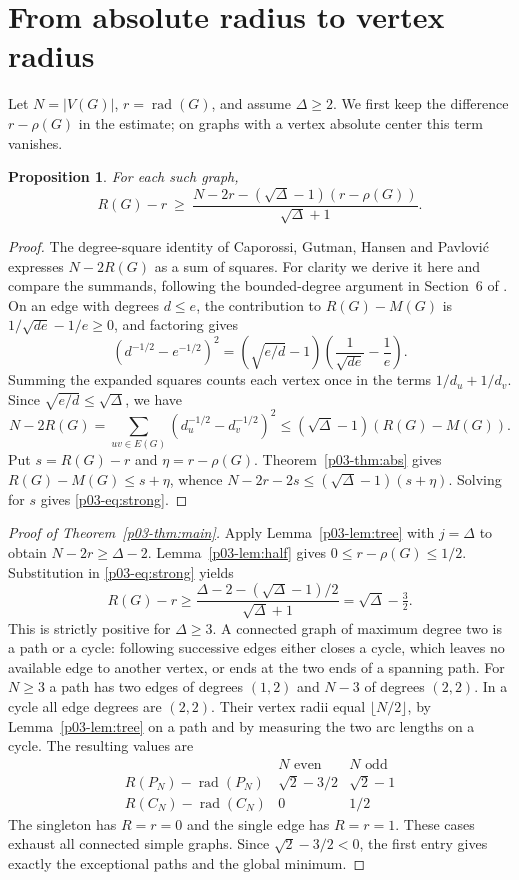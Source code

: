 \documentclass[11pt,a4paper]{article}
\newtheorem{proposition}[theorem]{Proposition}
\newcommand{\rad}{\operatorname{rad}}\newcommand{\diam}{\operatorname{diam}}
\begin{document}
\section{From absolute radius to vertex radius}\label{p03-sec:finish}
Let $N=|V(G)|$, $r=\rad(G)$, and assume $\Delta\ge2$. We first keep
the difference $r-\rho(G)$ in the estimate; on graphs with a vertex
absolute center this term vanishes.
\begin{proposition}\label{p03-prop:energy}
For each such graph,
\begin{equation}\label{p03-eq:strong}
 R(G)-r \ \ge\
 \frac{N-2r-(\sqrt{\Delta}-1)(r-\rho(G))}{\sqrt{\Delta}+1}.
\end{equation}
\end{proposition}
\begin{proof}
The degree-square identity of Caporossi, Gutman, Hansen and
Pavlovi\'c \cite{p03-CGHP} expresses $N-2R(G)$ as a sum of squares.
For clarity we derive it here and compare the summands, following the
bounded-degree argument in Section~6 of \cite{p03-CPS}. On an edge with
degrees $d\le e$, the contribution to $R(G)-M(G)$ is
$1/\sqrt{de}-1/e\ge0$, and factoring gives
\[
 (d^{-1/2}-e^{-1/2})^2
  =(\sqrt{e/d}-1)\left(\frac1{\sqrt{de}}-\frac1e\right).
\]
Summing the expanded squares counts each vertex once in the terms
$1/d_u+1/d_v$. Since $\sqrt{e/d}\le\sqrt{\Delta}$, we have
\[
 N-2R(G)=\sum_{uv\in E(G)}(d_u^{-1/2}-d_v^{-1/2})^2
 \le(\sqrt{\Delta}-1)(R(G)-M(G)).
\]
Put $s=R(G)-r$ and $\eta=r-\rho(G)$. Theorem~\ref{p03-thm:abs} gives
$R(G)-M(G)\le s+\eta$, whence
$N-2r-2s\le(\sqrt{\Delta}-1)(s+\eta)$. Solving for $s$
gives \eqref{p03-eq:strong}.
\end{proof}

\begin{proof}[Proof of Theorem~\ref{p03-thm:main}]
Apply Lemma~\ref{p03-lem:tree} with $j=\Delta$ to obtain $N-2r\ge\Delta-2$.
Lemma~\ref{p03-lem:half} gives $0\le r-\rho(G)\le1/2$.
Substitution in \eqref{p03-eq:strong} yields
\[
 R(G)-r\ge
 \frac{\Delta-2-(\sqrt{\Delta}-1)/2}{\sqrt{\Delta}+1}
 =\sqrt{\Delta}-\tfrac32 .
\]
This is strictly positive for $\Delta\ge3$. A connected graph of
maximum degree two is a path or a cycle: following successive edges
either closes a cycle, which leaves no available edge to another
vertex, or ends at the two ends of a spanning path. For $N\ge3$ a
path has two edges of degrees $(1,2)$ and $N-3$ of degrees $(2,2)$.
In a cycle all edge degrees are $(2,2)$. Their vertex radii equal
$\lfloor N/2\rfloor$, by Lemma~\ref{p03-lem:tree} on a path and by measuring
the two arc lengths on a cycle. The resulting values are
\[
\begin{array}{c|cc}
 & N\text{ even}&N\text{ odd}\\ \hline
 R(P_N)-\rad(P_N) & \sqrt2-3/2 & \sqrt2-1\\
 R(C_N)-\rad(C_N) & 0 & 1/2
\end{array}
\]
The singleton has $R=r=0$ and the single edge has $R=r=1$.
These cases exhaust all connected simple graphs. Since
$\sqrt2-3/2<0$, the first entry gives exactly the exceptional paths
and the global minimum.
\end{proof}
\end{document}

